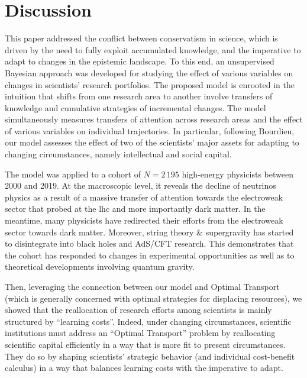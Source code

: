 \documentclass{article}
\begin{document}
\section{Discussion}

This paper addressed the conflict between conservatism in science, which is driven by the need to fully exploit accumulated knowledge, and the imperative to adapt to changes in the epistemic landscape. To this end, an unsupervised Bayesian approach was developed for studying the effect of various variables on changes in scientists' research portfolios. The proposed model is enrooted in the intuition that shifts from one research area to another involve transfers of knowledge and cumulative strategies of incremental changes. The model simultaneously measures transfers of attention across research areas and the effect of various variables on individual trajectories. In particular, following Bourdieu, our model assesses the effect of two of the scientists' major assets for adapting to changing circumstances, namely intellectual and social capital.






The model was applied to a cohort of $N=2\,195$ high-energy physicists between 2000 and 2019. At the macroscopic level, it reveals the decline of neutrinos physics as a result of a massive transfer of attention towards the electroweak sector that probed at the \gls{lhc} and more importantly dark matter. In the meantime, many physicists have redirected their efforts from the electroweak sector towards dark matter. Moreover, string theory \& supergravity has started to disintegrate into black holes and AdS/CFT research. This demonstrates that the cohort has responded to changes in experimental opportunities as well as to theoretical developments involving quantum gravity.

Then, leveraging the connection between our model and Optimal Transport (which is generally concerned with optimal strategies for displacing resources), we showed that the reallocation of research efforts among scientists is mainly structured by ``learning costs''. Indeed, under changing circumstances, scientific institutions must address an ``Optimal Transport'' problem by reallocating scientific capital efficiently in a way that is more fit to present circumstances. They do so by shaping scientists' strategic behavior (and individual cost-benefit calculus) in a way that balances learning costs with the imperative to adapt. 
\end{document}
